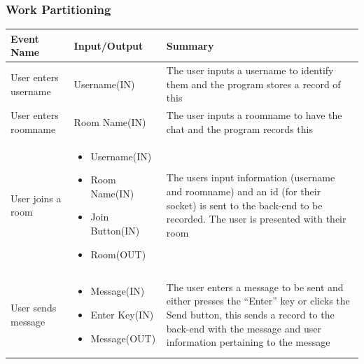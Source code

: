 \documentclass[12pt, titlepage]{article}
\begin{document}
        \subsubsection{Work Partitioning}
\FloatBarrier
    \begin{table}[!h]
    \centering
     \setlength{\leftmargini}{0.4cm}
    \begin{tabular}{| m{2cm} | m{3.3cm} |m{10cm} |}
    \hline
    \textbf{Event Name} & \textbf{Input/Output} & \textbf{Summary}
 \\ 
    \hline
    User enters username & Username(IN) & The user inputs a username to identify them and the program stores a record of this\\ 
    \hline
    User enters roomname & Room Name(IN) & The user inputs a roomname to have the chat and the program records this\\
	\hline
    User joins a room &
        \begin{itemize}
            \item Username(IN)
    		\item Room Name(IN)
    		\item Join Button(IN) 
    		\item Room(OUT)
        \end{itemize}
		& The users input information (username and roomname) and an id (for their socket) is sent to the back-end to be recorded. The user is presented with their room\\
		\hline
		User sends message &
    	\begin{itemize}
            \item Message(IN) 
    		\item Enter Key(IN)
    		\item Message(OUT) 
        \end{itemize}
		& The user enters a message to be sent and either presses the ``Enter'' key or clicks the Send button, this sends a record to the back-end with the message and user information pertaining to the message\\ 
		\hline
    \end{tabular}
    \label{Table}
    \end{table}
\FloatBarrier
\end{document}
